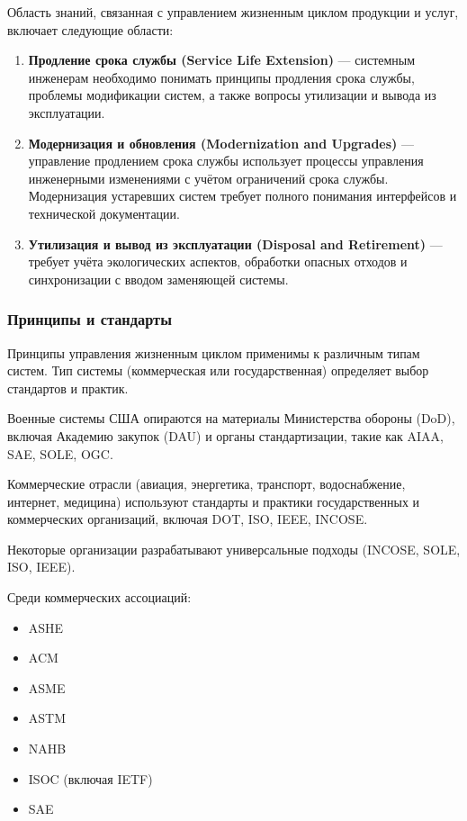\documentclass[14pt,a4paper]{extarticle}
\begin{document}
Область знаний, связанная с управлением жизненным циклом продукции и услуг, включает следующие области:

\begin{enumerate}
\item \textbf{Продление срока службы (Service Life Extension)} — системным инженерам необходимо понимать принципы продления срока службы, проблемы модификации систем, а также вопросы утилизации и вывода из эксплуатации.

\item \textbf{Модернизация и обновления (Modernization and Upgrades)} — управление продлением срока службы использует процессы управления инженерными изменениями с учётом ограничений срока службы. Модернизация устаревших систем требует полного понимания интерфейсов и технической документации.

\item \textbf{Утилизация и вывод из эксплуатации (Disposal and Retirement)} — требует учёта экологических аспектов, обработки опасных отходов и синхронизации с вводом заменяющей системы.
\end{enumerate}

\subsubsection{Принципы и стандарты}

Принципы управления жизненным циклом применимы к различным типам систем. Тип системы (коммерческая или государственная) определяет выбор стандартов и практик.

Военные системы США опираются на материалы Министерства обороны (DoD), включая Академию закупок (DAU) и органы стандартизации, такие как AIAA, SAE, SOLE, OGC.

Коммерческие отрасли (авиация, энергетика, транспорт, водоснабжение, интернет, медицина) используют стандарты и практики государственных и коммерческих организаций, включая DOT, ISO, IEEE, INCOSE.

Некоторые организации разрабатывают универсальные подходы (INCOSE, SOLE, ISO, IEEE).

Среди коммерческих ассоциаций:

\begin{itemize}
\item ASHE
\item ACM
\item ASME
\item ASTM
\item NAHB
\item ISOC (включая IETF)
\item SAE
\end{itemize}
\end{document}
